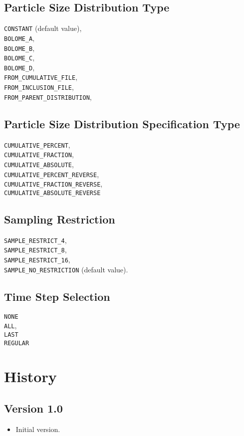 \documentclass[10pt]{article}
\begin{document}
\subsection{Particle Size Distribution Type}

\verb+CONSTANT+ (default value),\\
\verb+BOLOME_A+,\\
\verb+BOLOME_B+,\\
\verb+BOLOME_C+,\\
\verb+BOLOME_D+,\\
\verb+FROM_CUMULATIVE_FILE+,\\
\verb+FROM_INCLUSION_FILE+,\\
\verb+FROM_PARENT_DISTRIBUTION+,\\

\subsection{Particle Size Distribution Specification Type}
	\verb+CUMULATIVE_PERCENT+,\\
	\verb+CUMULATIVE_FRACTION+,\\
	\verb+CUMULATIVE_ABSOLUTE+,\\
	\verb+CUMULATIVE_PERCENT_REVERSE+,\\
	\verb+CUMULATIVE_FRACTION_REVERSE+,\\
	\verb+CUMULATIVE_ABSOLUTE_REVERSE+


\subsection{Sampling Restriction}

		\verb+SAMPLE_RESTRICT_4+,\\
		\verb+SAMPLE_RESTRICT_8+,\\
		\verb+SAMPLE_RESTRICT_16+,\\
		\verb+SAMPLE_NO_RESTRICTION+ (default value).



\subsection{Time Step Selection}
	\verb+NONE+\\
	\verb+ALL+,\\
	\verb+LAST+\\
	\verb+REGULAR+


\section{History}

\subsection*{Version 1.0}
\begin{itemize}
	\item Initial version.
\end{itemize}
	
\end{document}
